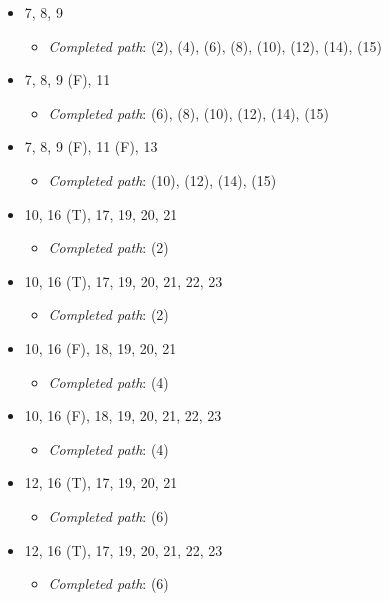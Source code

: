 \documentclass{article}
\newcommand{\completedpath}{\textit{Completed path}}
\begin{document}
\begin{itemize}
    \item 7, 8, 9
          \begin{itemize}
              \item \completedpath: (2), (4), (6), (8), (10), (12), (14), (15)
          \end{itemize}
    \item 7, 8, 9 (F), 11
          \begin{itemize}
              \item \completedpath: (6), (8), (10), (12), (14), (15)
          \end{itemize}
    \item 7, 8, 9 (F), 11 (F), 13
          \begin{itemize}
              \item \completedpath: (10), (12), (14), (15)
          \end{itemize}
    \item 10, 16 (T), 17, 19, 20, 21
          \begin{itemize}
              \item \completedpath: (2)
          \end{itemize}
    \item 10, 16 (T), 17, 19, 20, 21, 22, 23
          \begin{itemize}
              \item \completedpath: (2)
          \end{itemize}
    \item 10, 16 (F), 18, 19, 20, 21
          \begin{itemize}
              \item \completedpath: (4)
          \end{itemize}
    \item 10, 16 (F), 18, 19, 20, 21, 22, 23
          \begin{itemize}
              \item \completedpath: (4)
          \end{itemize}
    \item 12, 16 (T), 17, 19, 20, 21
          \begin{itemize}
              \item \completedpath: (6)
          \end{itemize}
    \item 12, 16 (T), 17, 19, 20, 21, 22, 23
          \begin{itemize}
              \item \completedpath: (6)

\end{itemize}
\end{itemize}
\end{document}
